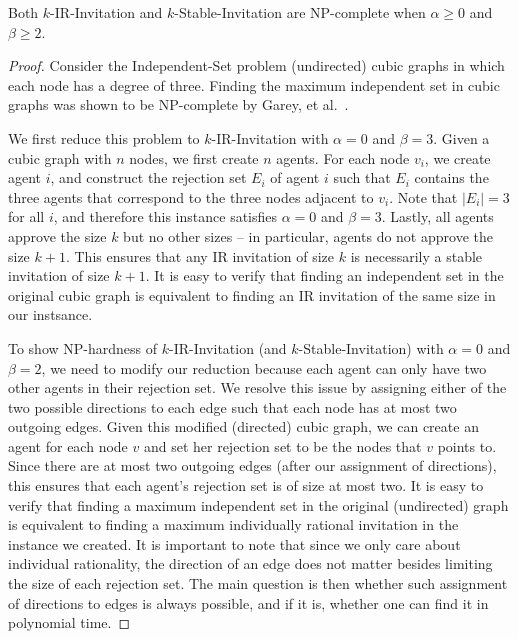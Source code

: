 \begin{theorem} \label{SIP:thm:nphard_a0_b2}
	Both $k$-IR-Invitation and $k$-Stable-Invitation are NP-complete when $\alpha \geq 0$ and $\beta \geq 2$. 
\end{theorem} 
\begin{proof}
Consider the Independent-Set problem (undirected) cubic graphs in which each node has a degree of three. Finding the maximum independent set in cubic graphs was shown to be NP-complete by Garey, et al.~\cite{Garey_Max_Is_Cubic}. 

We first reduce this problem to $k$-IR-Invitation with $\alpha = 0$ and $\beta = 3$. Given a cubic graph with $n$ nodes, we first create $n$ agents. For each node $v_i$, we create agent $i$, and construct the rejection set $E_i$ of agent $i$ such that $E_i$ contains the three agents that correspond to the three nodes adjacent to $v_i$.  Note that $|E_i| = 3$ for all $i$, and therefore this instance satisfies $\alpha = 0$ and $\beta = 3$. Lastly, all agents approve the size $k$ but no other sizes -- in particular, agents do not approve the size $k+1$. This ensures that any IR invitation of size $k$ is necessarily a stable invitation of size $k+1$. It is easy to verify that finding an independent set in the original cubic graph is equivalent to finding an IR invitation of the same size in our instsance. 
	
To show NP-hardness of $k$-IR-Invitation (and $k$-Stable-Invitation) with $\alpha = 0$ and $\beta = 2$, we need to modify our reduction because each agent can only have two other agents in their rejection set.  We resolve this issue by assigning either of the two possible directions to each edge such that each node has at most two outgoing edges. Given this modified (directed) cubic graph, we can create an agent for each node $v$ and set her rejection set to be the nodes that $v$ points to. Since there are at most two outgoing edges (after our assignment of directions), this ensures that each agent's rejection set is of size at most two. It is easy to verify that finding a maximum independent set in the original (undirected) graph is equivalent to finding a maximum individually rational invitation in the instance we created. It is important to note that since we only care about individual rationality, the direction of an edge does not matter besides limiting the size of each rejection set.  The main question is then whether such assignment of directions to edges is always possible, and if it is, whether one can find it in polynomial time. 


\end{proof}
